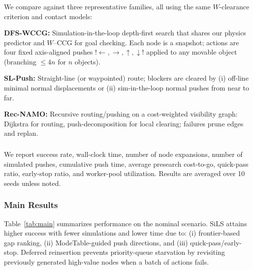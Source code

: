 \subsubsection{}
\label{subsec:baselines}
We compare against three representative families, all using the same
$W$-clearance criterion and contact models:

\textbf{DFS-WCCG:} Simulation-in-the-loop depth-first search 
that shares our physics predictor and $W$–CCG for goal checking.
Each node is a snapshot; actions are four fixed axis-aligned pushes 
${!\leftarrow,\rightarrow,\uparrow,\downarrow!}$ 
applied to any movable object (branching $\le 4n$ for $n$ objects).

\textbf{SL-Push:} Straight-line (or waypointed) route; blockers are
cleared by (i) off-line minimal normal displacements or
(ii) sim-in-the-loop normal pushes from near to far.

\textbf{Rec-NAMO:} Recursive routing/pushing on a cost-weighted
  visibility graph: Dijkstra for routing, push-decomposition for local
  clearing; failures prune edges and replan.


\subsubsection{}
\label{subsec:metrics}
We report success rate, wall-clock time, number of node expansions,
number of simulated pushes, cumulative push time, average presearch
cost-to-go, quick-pass ratio, early-stop ratio, and worker-pool
utilization. Results are averaged over 10 seeds unless noted.

\subsubsection{Main Results}
\label{subsec:main-results}
Table~\ref{tab:main} summarizes performance on the nominal scenario.
SiLS attains higher success with fewer simulations and lower time due to:
(i) frontier-based gap ranking, (ii) ModeTable-guided push directions,
and (iii) quick-pass/early-stop. Deferred reinsertion prevents
priority-queue starvation by revisiting previously generated high-value
nodes when a batch of actions fails.

